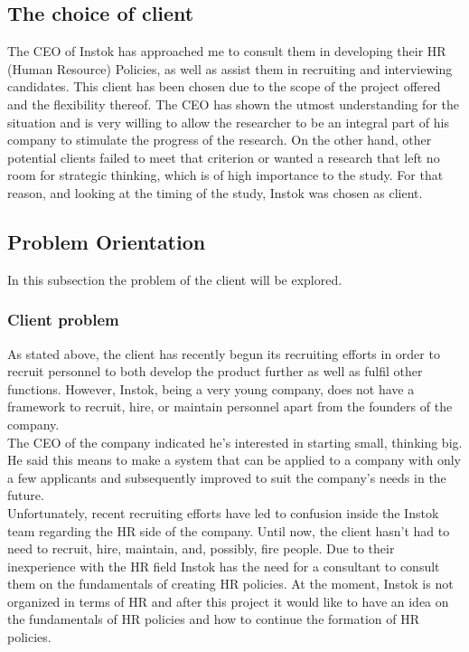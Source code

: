 \documentclass[man]{apa6}
\begin{document}
\subsection{The choice of client}
The CEO of Instok has approached me to consult them in developing their HR (Human Resource) Policies, as well as assist them in recruiting and interviewing candidates. This client has been chosen due to the scope of the project offered and the flexibility thereof. The CEO has shown the utmost understanding for the situation and is very willing to allow the researcher to be an integral part of his company to stimulate the progress of the research. On the other hand, other potential clients failed to meet that criterion or wanted a research that left no room for strategic thinking, which is of high importance to the study. For that reason, and looking at the timing of the study, Instok was chosen as client.

\subsection{Problem Orientation}
In this subsection the problem of the client will be explored.\\

\subsubsection{Client problem}
As stated above, the client has recently begun its recruiting efforts in order to recruit personnel to both develop the product further as well as fulfil other functions. However, Instok, being a very young company, does not have a framework to recruit, hire, or maintain personnel apart from the founders of the company. \\
The CEO of the company indicated he's interested in starting small, thinking big. He said this means to make a system that can be applied to a company with only a few applicants and subsequently improved to suit the company's needs in the future.\\
Unfortunately, recent recruiting efforts have led to confusion inside the Instok team regarding the HR side of the company. Until now, the client hasn't had to need to recruit, hire, maintain, and, possibly, fire people. Due to their inexperience with the HR field Instok has the need for a consultant to consult them on the fundamentals of creating HR policies. At the moment, Instok is not organized in terms of HR and after this project it would like to have an idea on the fundamentals of HR policies and how to continue the formation of HR policies.
\end{document}
